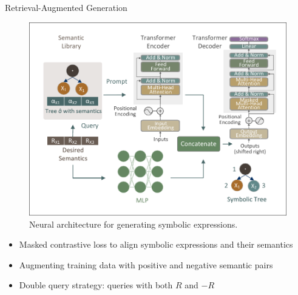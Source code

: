 \documentclass[final]{beamer}
\newlength{\onecolwid}
\begin{document}
\begin{frame}[t]
\begin{columns}[t]
\begin{column}{\onecolwid}
                \begin{block}{Retrieval-Augmented Generation}
                    \begin{figure}
                        \centering
                        \includegraphics[width=\linewidth, trim=25 20 15 10, clip]{figs/Transformer.pdf}
                        \caption{Neural architecture for generating symbolic expressions.}
                    \end{figure}


                    \begin{itemize}
                        \item Masked contrastive loss to align symbolic expressions and their semantics
                        \item Augmenting training data with positive and negative semantic pairs
                        \item Double query strategy: queries with both $R$ and $-R$
                    \end{itemize}


\end{block}
\end{column}
\end{columns}
\end{frame}
\end{document}

